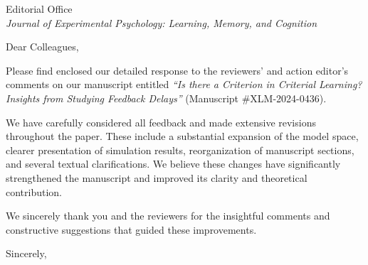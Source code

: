 \documentclass[12pt]{letter}
\date{\today}
\begin{document}
\begin{letter}{Editorial Office \\ 
\textit{Journal of Experimental Psychology: Learning, Memory, and Cognition}}

\opening{Dear Colleagues,}

Please find enclosed our detailed response to the reviewers’
and action editor’s comments on our manuscript entitled
\textit{“Is there a Criterion in Criterial Learning?
Insights from Studying Feedback Delays”} (Manuscript
\#XLM-2024-0436). 

We have carefully considered all feedback and made extensive
revisions throughout the paper. These include a substantial
expansion of the model space, clearer presentation of
simulation results, reorganization of manuscript sections,
and several textual clarifications. We believe these changes
have significantly strengthened the manuscript and improved
its clarity and theoretical contribution.

We sincerely thank you and the reviewers for the insightful
comments and constructive suggestions that guided these
improvements. 

\closing{Sincerely,}

\end{letter}
\end{document}
